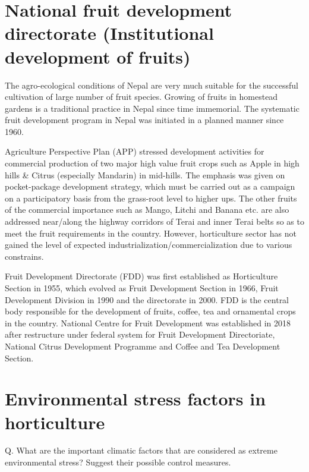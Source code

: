 \documentclass[]{book}
\begin{document}
\hypertarget{national-fruit-development-directorate-institutional-development-of-fruits}{%
\section{National fruit development directorate (Institutional development of fruits)}\label{national-fruit-development-directorate-institutional-development-of-fruits}}

The agro-ecological conditions of Nepal are very much suitable for the successful cultivation of large number of fruit species. Growing of fruits in homestead gardens is a traditional practice in Nepal since time immemorial. The systematic fruit development program in Nepal was initiated in a planned manner since 1960.

Agriculture Perspective Plan (APP) stressed development activities for commercial production of two major high value fruit crops such as Apple in high hills \& Citrus (especially Mandarin) in mid-hills. The emphasis was given on pocket-package development strategy, which must be carried out as a campaign on a participatory basis from the grass-root level to higher ups. The other fruits of the commercial importance such as Mango, Litchi and Banana etc. are also addressed near/along the highway corridors of Terai and inner Terai belts so as to meet the fruit requirements in the country. However, horticulture sector has not gained the level of expected industrialization/commercialization due to various constrains.

Fruit Development Directorate (FDD) was first established as Horticulture Section in 1955, which evolved as Fruit Development Section in 1966, Fruit Development Division in 1990 and the directorate in 2000. FDD is the central body responsible for the development of fruits, coffee, tea and ornamental crops in the country. National Centre for Fruit Development was established in 2018 after restructure under federal system for Fruit Development Directoriate, National Citrus Development Programme and Coffee and Tea Development Section.

\hypertarget{environmental-stress-factors-in-horticulture}{%
\section{Environmental stress factors in horticulture}\label{environmental-stress-factors-in-horticulture}}

Q. What are the important climatic factors that are considered as extreme environmental stress? Suggest their possible control measures.
\end{document}
